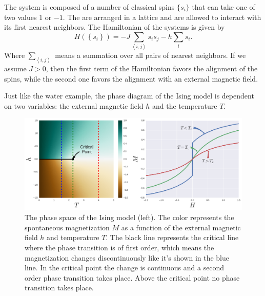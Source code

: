 The system is composed of a number of classical spins $\{s_i\}$ that can take
one of two values $1$ or $-1$. The are arranged in a lattice and are allowed to
interact with its first nearest neighbors. The Hamiltonian of the systems is
given by
\begin{equation}
    \label{eq:ising}
    H\left(\left\{s_{i}\right\}\right) = 
        -J\sum_{\left\langle i,j\right\rangle}s_{i}s_{j}
        -h\sum_{i}s_{i}.
\end{equation}
Where $\sum_{\left\langle i,j\right\rangle}$ means a summation over all pairs
of nearest neighbors. If we assume $J>0$, then the first term of the
Hamiltonian favors the alignment of the spins, while the second one 
favors the alignment with an external magnetic field.

Just like the water example, the phase diagram of the Ising model is dependent
on two variables: the external magnetic field $h$ and the temperature $T$.

\begin{figure}
\begin{center}
    \includegraphics[scale=0.4]{chapters/ch2-crit/figs/ising_phase2}
\end{center}
\caption{The phase space of the Ising model (left). The color represents the
    spontaneous magnetization $M$ as a function of the external magnetic field
    $h$ and temperature $T$. The black line represents the critical line where
    the phase transition is of first order, which means the magnetization
    changes discontinuously like it's shown in the blue line. In the critical
    point the change is continuous and a second order phase transition takes
    place. Above the critical point no phase transition takes place.}
\label{fig:ising_phase2}
\end{figure}


